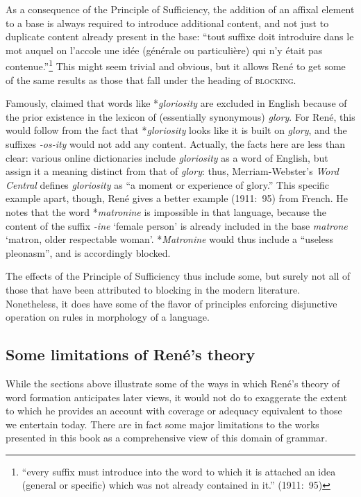 \documentclass[output=paper]{langsci/langscibook}
\begin{document}
As a consequence of the Principle of Sufficiency, the addition of an
affixal element to a base is always required to introduce additional
content, and not just to duplicate content already present in the
base: ``tout suffixe doit introduire dans le mot auquel on l'accole
une idée (générale ou particulière) qui n'y était pas
contenue.''\footnote{``every suffix must introduce into the word to
  which it is attached an idea (general or specific) which was not
  already contained in it.'' (1911:~95)}  This might seem trivial and
obvious, but it allows René to get some of the same results as those
that fall under the heading of \textsc{blocking}.

Famously,  claimed that words like
*\emph{gloriosity} are excluded in English because of the prior
existence in the lexicon of (essentially synonymous) \emph{glory}. For
René, this would follow from the fact that *\emph{gloriosity} looks
like it is built on \emph{glory}, and the suffixes \emph{-os-ity}
would not add any content. Actually, the facts here are less than
clear: various online dictionaries include \emph{gloriosity} as a word
of English, but assign it a meaning distinct from that of
\emph{glory}: thus, Merriam-Webster's \emph{Word Central} defines
\emph{gloriosity} as ``a moment or experience of glory.''  This
specific example apart, though, René gives a better example (1911:~95)
from French. He notes that the word *\emph{matronine} is impossible in
that language, because the content of the suffix \emph{-ine} `female
person' is already included in the base \emph{matrone} `matron, older
respectable woman'.  *\emph{Matronine} would thus include a ``useless
pleonasm'', and is accordingly blocked.

The effects of the Principle of Sufficiency thus include some, but
surely not all of those that have been attributed to blocking in the
modern literature. Nonetheless, it does have some of the flavor of
principles enforcing disjunctive operation on rules in morphology of a
language.

\subsection{Some limitations of René's theory}
\label{sec:limitations}

While the sections above illustrate some of the ways in which René's
theory of word formation anticipates later views, it would not do to
exaggerate the extent to which he provides an account with coverage or
adequacy equivalent to those we entertain today. There are in fact
some major limitations to the works presented in this book as a
comprehensive view of this domain of grammar.
\end{document}
